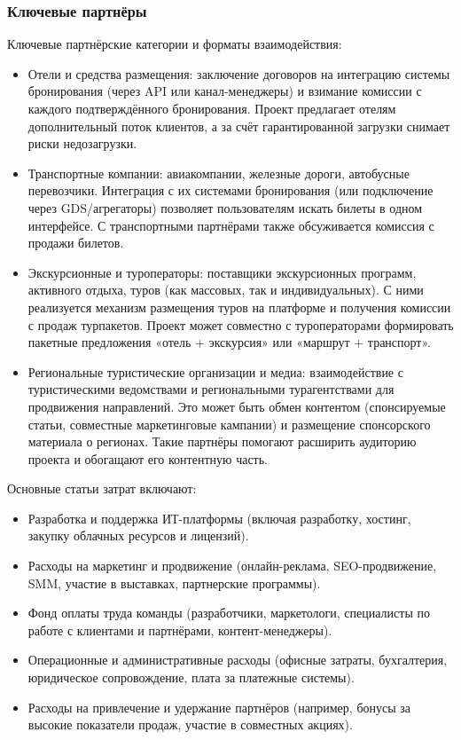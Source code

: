\subsubsection*{Ключевые партнёры}
Ключевые партнёрские категории и форматы взаимодействия:
\begin{itemize}
    \item Отели и средства размещения: заключение договоров на интеграцию системы бронирования (через API или канал-менеджеры) и взимание комиссии с каждого подтверждённого бронирования. Проект предлагает отелям дополнительный поток клиентов, а за счёт гарантированной загрузки снимает риски недозагрузки.
    \item Транспортные компании: авиакомпании, железные дороги, автобусные перевозчики. Интеграция с их системами бронирования (или подключение через GDS/агрегаторы) позволяет пользователям искать билеты в одном интерфейсе. С транспортными партнёрами также обсуживается комиссия с продажи билетов.
    \item Экскурсионные и туроператоры: поставщики экскурсионных программ, активного отдыха, туров (как массовых, так и индивидуальных). С ними реализуется механизм размещения туров на платформе и получения комиссии с продаж турпакетов. Проект может совместно с туроператорами формировать пакетные предложения «отель + экскурсия» или «маршрут + транспорт».
    \item Региональные туристические организации и медиа: взаимодействие с туристическими ведомствами и региональными турагентствами для продвижения направлений. Это может быть обмен контентом (спонсируемые статьи, совместные маркетинговые кампании) и размещение спонсорского материала о регионах. Такие партнёры помогают расширить аудиторию проекта и обогащают его контентную часть.
\end{itemize}

\noindent Основные статьи затрат включают:
\begin{itemize}
    \item Разработка и поддержка ИТ-платформы (включая разработку, хостинг, закупку облачных ресурсов и лицензий).
    \item Расходы на маркетинг и продвижение (онлайн-реклама, SEO-продвижение, SMM, участие в выставках, партнерские программы).
    \item Фонд оплаты труда команды (разработчики, маркетологи, специалисты по работе с клиентами и партнёрами, контент-менеджеры).
    \item Операционные и административные расходы (офисные затраты, бухгалтерия, юридическое сопровождение, плата за платежные системы).
    \item Расходы на привлечение и удержание партнёров (например, бонусы за высокие показатели продаж, участие в совместных акциях).
\end{itemize}

